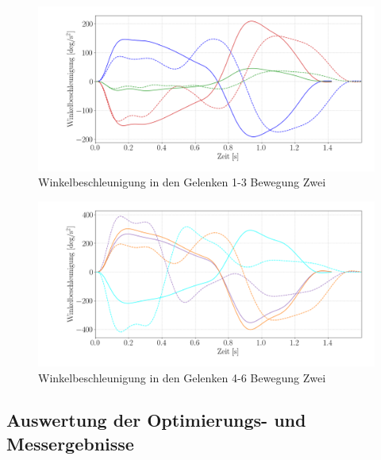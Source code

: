 \begin{figure}[tbph]
	\centering
	\includegraphics[width=1\linewidth]{images/accup1}
	\caption{Winkelbeschleunigung in den Gelenken 1-3 Bewegung Zwei}
	\label{fig:accup1}
\end{figure}
\begin{figure}[tbph]
	\centering
	\includegraphics[width=1\linewidth]{images/accup2}
	\caption{Winkelbeschleunigung in den Gelenken 4-6 Bewegung Zwei}
	\label{fig:accup2}
\end{figure}

\subsection{Auswertung der Optimierungs- und Messergebnisse} 

%

